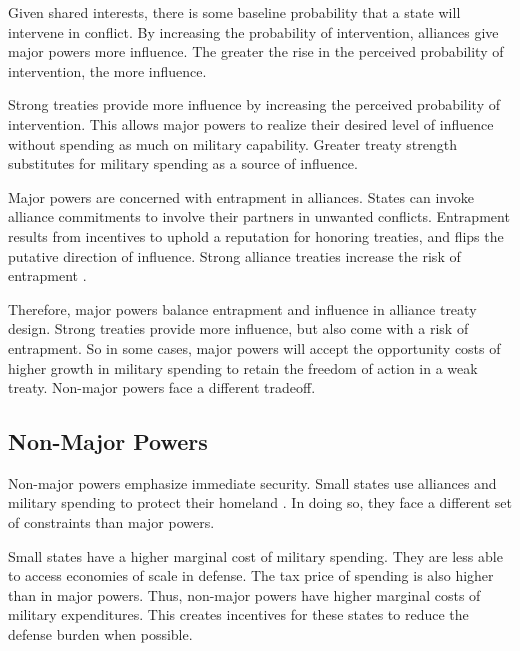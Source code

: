 \documentclass[12pt]{article}
\begin{document}
Given shared interests, there is some baseline probability that a state will intervene in conflict. 
By increasing the probability of intervention, alliances give major powers more influence. 
The greater the rise in the perceived probability of intervention, the more influence.


Strong treaties provide more influence by increasing the perceived probability of intervention. 
This allows major powers to realize their desired level of influence without spending as much on military capability. 
Greater treaty strength substitutes for military spending as a source of influence.  


Major powers are concerned with entrapment in alliances. 
States can invoke alliance commitments to involve their partners in unwanted conflicts. 
Entrapment results from incentives to uphold a reputation for honoring treaties, and flips the putative direction of influence. 
Strong alliance treaties increase the risk of entrapment \citep{Snyder1997, Benson2012, Yarhi-Miloetal2016}.


Therefore, major powers balance entrapment and influence in alliance treaty design. 
Strong treaties provide more influence, but also come with a risk of entrapment. 
So in some cases, major powers will accept the opportunity costs of higher growth in military spending to retain the freedom of action in a weak treaty. 
Non-major powers face a different tradeoff. 


\subsection{Non-Major Powers} 


Non-major powers emphasize immediate security.
Small states use alliances and military spending to protect their homeland \citep{Morrow1991}. 
In doing so, they face a different set of constraints than major powers. 


Small states have a higher marginal cost of military spending. 
They are less able to access economies of scale in defense. 
The tax price of spending is also higher than in major powers. 
Thus, non-major powers have higher marginal costs of military expenditures. 
This creates incentives for these states to reduce the defense burden when possible.
\end{document}
